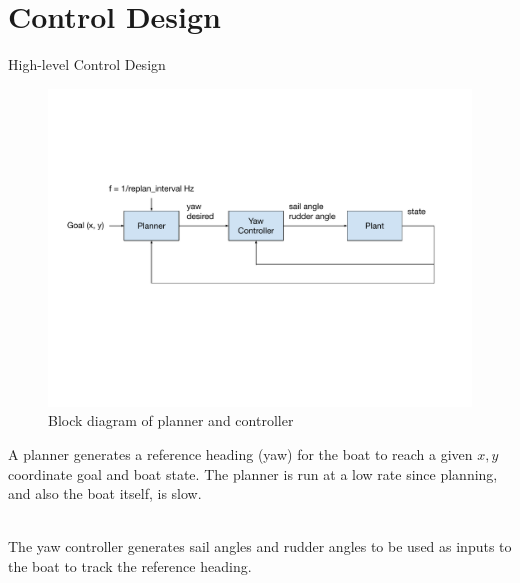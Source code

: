 \documentclass[10pt,xcolor={table,dvipsnames},t]{beamer}
\begin{document}
\section{Control Design}

\begin{frame}{High-level Control Design}

\begin{figure}
    \centering
    \includegraphics[width=\linewidth,trim={1cm 7cm 2cm 5cm},clip]{documents/final_pres_figs/controller_block_diagram.pdf}
    \caption{Block diagram of planner and controller}
    \label{fig:controller_block_diagram}
\end{figure}
    
A planner generates a reference heading (yaw) for the boat to reach a given \(x, y\) coordinate goal
and boat state.
The planner is run at a low rate since planning, and also the boat itself, is slow.

\hfill\\
The yaw controller generates sail angles and rudder angles to be used as inputs to the boat to
track the reference heading.

\end{frame}
\end{document}
